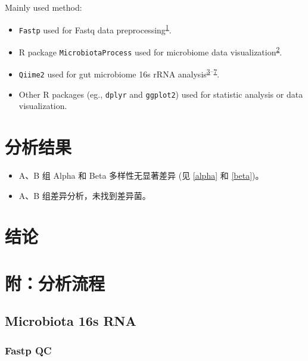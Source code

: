 \documentclass[
]{article}
\providecommand{\tightlist}{%
  \setlength{\itemsep}{0pt}\setlength{\parskip}{0pt}}
\begin{document}
Mainly used method:

\begin{itemize}
\tightlist
\item
  \texttt{Fastp} used for Fastq data preprocessing\textsuperscript{\protect\hyperlink{ref-UltrafastOnePChen2023}{1}}.
\item
  R package \texttt{MicrobiotaProcess} used for microbiome data visualization\textsuperscript{\protect\hyperlink{ref-MicrobiotaproceXuSh2023}{2}}.
\item
  \texttt{Qiime2} used for gut microbiome 16s rRNA analysis\textsuperscript{\protect\hyperlink{ref-ReproducibleIBolyen2019}{3}--\protect\hyperlink{ref-MicrobialCommuHamday2009}{7}}.
\item
  Other R packages (eg., \texttt{dplyr} and \texttt{ggplot2}) used for statistic analysis or data visualization.
\end{itemize}

\hypertarget{results}{%
\section{分析结果}\label{results}}

\begin{itemize}
\tightlist
\item
  A、B 组 Alpha 和 Beta 多样性无显著差异 (见 \ref{alpha} 和 \ref{beta})。
\item
  A、B 组差异分析，未找到差异菌。
\end{itemize}

\hypertarget{dis}{%
\section{结论}\label{dis}}

\hypertarget{workflow}{%
\section{附：分析流程}\label{workflow}}

\hypertarget{microbiota-16s-rna}{%
\subsection{Microbiota 16s RNA}\label{microbiota-16s-rna}}

\hypertarget{fastp-qc}{%
\subsubsection{Fastp QC}\label{fastp-qc}}
\end{document}
